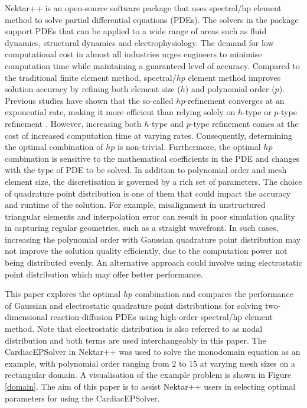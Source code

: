 Nektar++ is an open-source software package that uses spectral/hp element method to solve partial differential equations (PDEs). The solvers in the package support PDEs that can be applied to a wide range of areas such as fluid dynamics, structural dynamics and electrophysiology. The demand for low computational cost in almost all industries urges engineers to minimise computation time while maintaining a guaranteed level of accuracy. Compared to the traditional finite element method, spectral/$hp$ element method improves solution accuracy by refining both element size ($h$) and polynomial order ($p$). Previous studies have shown that the so-called $hp$-refinement converges at an exponential rate, making it more efficient than relying solely on $h$-type or $p$-type refinement \cite{RefWorks:karniadakis2005spectral/hp}. However, increasing both $h$-type and $p$-type refinement comes at the cost of increased computation time at varying rates. Consequently, determining the optimal combination of $hp$ is non-trivial. Furthermore, the optimal $hp$ combination is sensitive to the mathematical coefficients in the PDE and changes with the type of PDE to be solved. In addition to polynomial order and mesh element size, the discretisation is governed by a rich set of parameters. The choice of quadrature point distribution is one of them that could impact the accuracy and runtime of the solution. For example, misalignment in unstructured triangular elements and interpolation error can result in poor simulation quality in capturing regular geometries, such as a straight wavefront. In such cases, increasing the polynomial order with Gaussian quadrature point distribution may not improve the solution quality efficiently, due to the computation power not being distributed evenly. An alternative approach could involve using electrostatic point distribution which may offer better performance.
\par
This paper explores the optimal $hp$ combination and compares the performance of Gaussian and electrostatic quadrature point distributions for solving two-dimensional reaction-diffusion PDEs using high-order spectral/hp element method. Note that electrostatic distribution is also referred to as nodal distribution and both terms are used interchangeably in this paper. The CardiacEPSolver in Nektar++ was used to solve the monodomain equation as an example, with polynomial order ranging from 2 to 15 at varying mesh sizes on a rectangular domain. A visualisation of the example problem is shown in Figure \ref{domain}. The aim of this paper is to assist Nektar++ users in selecting optimal parameters for using the CardiacEPSolver. 
